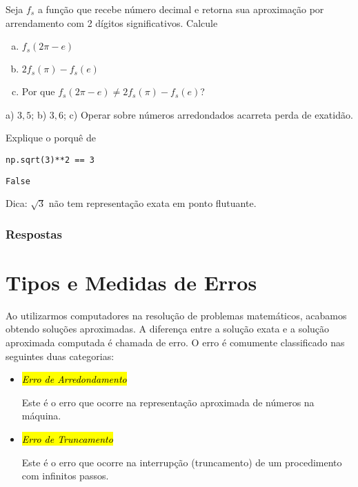 \begin{exer}
  Seja $f_s$ a função que recebe número decimal e retorna sua aproximação por arrendamento com 2 dígitos significativos. Calcule
  \begin{enumerate}[a)]
  \item $f_s(2\pi - e)$
  \item $2f_s(\pi) - f_s(e)$
  \item Por que $f_s(2\pi - e) \neq  2f_s(\pi) - f_s(e)$?
  \end{enumerate}
\end{exer}
\begin{resp}
  a) $3,5$; b) $3,6$; c) Operar sobre números arredondados acarreta perda de exatidão.
\end{resp}


\begin{exer}
  Explique o porquê de

\begin{lstlisting}
np.sqrt(3)**2 == 3
\end{lstlisting}

\begin{verbatim}
False
\end{verbatim}

\end{exer}
\begin{resp}
  Dica: $\sqrt{3}$ não tem representação exata em ponto flutuante.
\end{resp}

\ifisbook
\subsubsection{Respostas}
\shipoutAnswer
\fi


\section{Tipos e Medidas de Erros}\label{cap_aritm_sec_erros}

Ao utilizarmos computadores na resolução de problemas matemáticos, acabamos obtendo soluções aproximadas. A diferença entre a solução exata e a solução aproximada computada é chamada de erro. O erro é comumente classificado nas seguintes duas categorias:
\begin{itemize}
\item \hl{\emph{Erro de Arredondamento}}

  Este é o erro que ocorre na representação aproximada de números na máquina.
  
\item \hl{\emph{Erro de Truncamento}}

  Este é o erro que ocorre na interrupção (truncamento) de um procedimento com infinitos passos.
\end{itemize}

